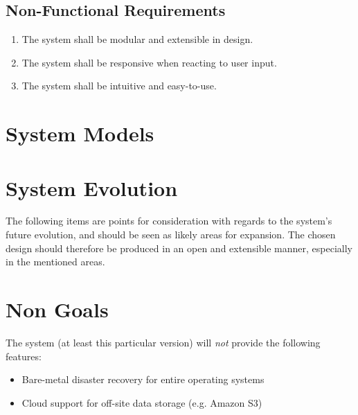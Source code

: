 \subsection{Non-Functional Requirements}

\begin{enumerate}
    \item The system shall be modular and extensible in design.
    \item The system shall be responsive when reacting to user input.
    \item The system shall be intuitive and easy-to-use.
\end{enumerate}

\section{System Models}

\section{System Evolution}

The following items are points for consideration with regards to the system's
future evolution, and should be seen as likely areas for expansion. The chosen
design should therefore be produced in an open and extensible manner,
especially in the mentioned areas.

\section{Non Goals}

The system (at least this particular version) will \emph{not} provide the
following features:

\begin{itemize}
    \item Bare-metal disaster recovery for entire operating systems
    \item Cloud support for off-site data storage (e.g. Amazon S3)
\end{itemize}
